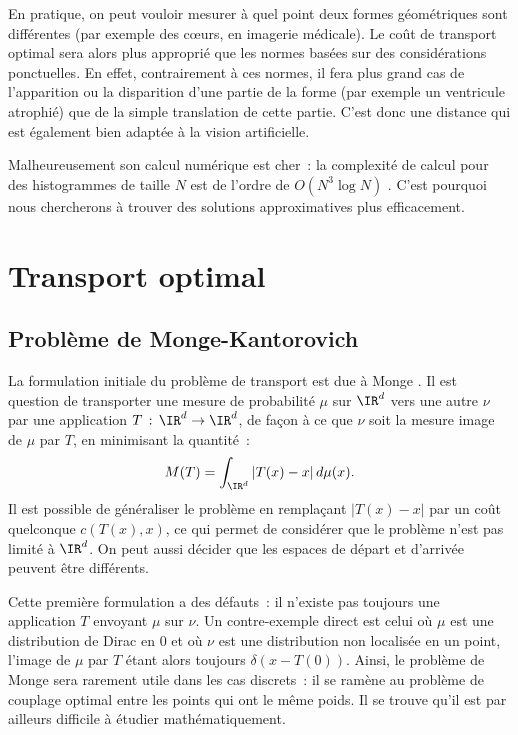 En pratique, on peut vouloir mesurer à quel point deux formes géométriques sont différentes (par exemple des c\oe urs, en imagerie médicale). Le coût de transport optimal sera alors plus approprié que les normes basées sur des considérations ponctuelles. En effet, contrairement à ces normes, il fera plus grand cas de l'apparition ou la disparition d'une partie de la forme (par exemple un ventricule atrophié) que de la simple translation de cette partie. C'est donc une distance qui est également bien adaptée à la vision artificielle.

Malheureusement son calcul numérique est cher~: la complexité de calcul pour des histogrammes de taille $N$ est de l'ordre de $O(N^3 \log N)$ \cite{pele09}. C'est pourquoi nous chercherons à trouver des solutions approximatives plus efficacement.


\section{Transport optimal}

\subsection{Problème de Monge-Kantorovich}
La formulation initiale du problème de transport est due à Monge \cite{villani08}. Il est question de transporter une mesure de probabilité $\mu$ sur $\IR^d$ vers une autre $\nu$ par une application $T\,:\,\IR^d \rightarrow \IR^d$, de façon à ce que $\nu$ soit la mesure image de $\mu$ par $T$, en minimisant la quantité~:
\begin{equation}
\label{eq:monge}
M(T) = \int_{\IR^d} |T(x)-x|\,d\mu(x) .
\end{equation}
Il est possible de généraliser le problème en remplaçant $|T(x)-x|$ par un coût quelconque $c(T(x),x)$, ce qui permet de considérer que le problème n'est pas limité à $\IR^d$. On peut aussi décider que les espaces de départ et d'arrivée peuvent être différents.

Cette première formulation a des défauts~: il n'existe pas toujours une application $T$ envoyant $\mu$ sur $\nu$. Un contre-exemple direct est celui où $\mu$ est une distribution de Dirac en 0 et où $\nu$ est une distribution non localisée en un point, l'image de $\mu$ par $T$ étant alors toujours $\delta(x-T(0))$. Ainsi, le problème de Monge sera rarement utile dans les cas discrets~: il se ramène au problème de couplage optimal entre les points qui ont le même poids. Il se trouve qu'il est par ailleurs difficile à étudier mathématiquement.

